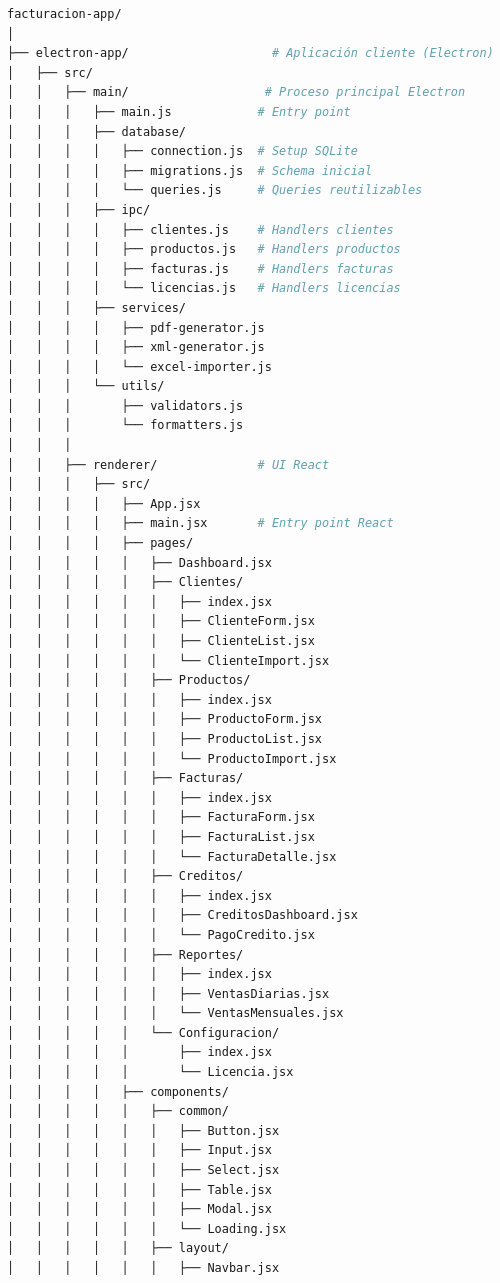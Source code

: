\documentclass[11pt,a4paper]{article}
\begin{document}
\begin{lstlisting}[language=bash]
facturacion-app/
│
├── electron-app/                    # Aplicación cliente (Electron)
│   ├── src/
│   │   ├── main/                   # Proceso principal Electron
│   │   │   ├── main.js            # Entry point
│   │   │   ├── database/
│   │   │   │   ├── connection.js  # Setup SQLite
│   │   │   │   ├── migrations.js  # Schema inicial
│   │   │   │   └── queries.js     # Queries reutilizables
│   │   │   ├── ipc/
│   │   │   │   ├── clientes.js    # Handlers clientes
│   │   │   │   ├── productos.js   # Handlers productos
│   │   │   │   ├── facturas.js    # Handlers facturas
│   │   │   │   └── licencias.js   # Handlers licencias
│   │   │   ├── services/
│   │   │   │   ├── pdf-generator.js
│   │   │   │   ├── xml-generator.js
│   │   │   │   └── excel-importer.js
│   │   │   └── utils/
│   │   │       ├── validators.js
│   │   │       └── formatters.js
│   │   │
│   │   ├── renderer/              # UI React
│   │   │   ├── src/
│   │   │   │   ├── App.jsx
│   │   │   │   ├── main.jsx       # Entry point React
│   │   │   │   ├── pages/
│   │   │   │   │   ├── Dashboard.jsx
│   │   │   │   │   ├── Clientes/
│   │   │   │   │   │   ├── index.jsx
│   │   │   │   │   │   ├── ClienteForm.jsx
│   │   │   │   │   │   ├── ClienteList.jsx
│   │   │   │   │   │   └── ClienteImport.jsx
│   │   │   │   │   ├── Productos/
│   │   │   │   │   │   ├── index.jsx
│   │   │   │   │   │   ├── ProductoForm.jsx
│   │   │   │   │   │   ├── ProductoList.jsx
│   │   │   │   │   │   └── ProductoImport.jsx
│   │   │   │   │   ├── Facturas/
│   │   │   │   │   │   ├── index.jsx
│   │   │   │   │   │   ├── FacturaForm.jsx
│   │   │   │   │   │   ├── FacturaList.jsx
│   │   │   │   │   │   └── FacturaDetalle.jsx
│   │   │   │   │   ├── Creditos/
│   │   │   │   │   │   ├── index.jsx
│   │   │   │   │   │   ├── CreditosDashboard.jsx
│   │   │   │   │   │   └── PagoCredito.jsx
│   │   │   │   │   ├── Reportes/
│   │   │   │   │   │   ├── index.jsx
│   │   │   │   │   │   ├── VentasDiarias.jsx
│   │   │   │   │   │   └── VentasMensuales.jsx
│   │   │   │   │   └── Configuracion/
│   │   │   │   │       ├── index.jsx
│   │   │   │   │       └── Licencia.jsx
│   │   │   │   ├── components/
│   │   │   │   │   ├── common/
│   │   │   │   │   │   ├── Button.jsx
│   │   │   │   │   │   ├── Input.jsx
│   │   │   │   │   │   ├── Select.jsx
│   │   │   │   │   │   ├── Table.jsx
│   │   │   │   │   │   ├── Modal.jsx
│   │   │   │   │   │   └── Loading.jsx
│   │   │   │   │   ├── layout/
│   │   │   │   │   │   ├── Navbar.jsx

\end{lstlisting}
\end{document}
